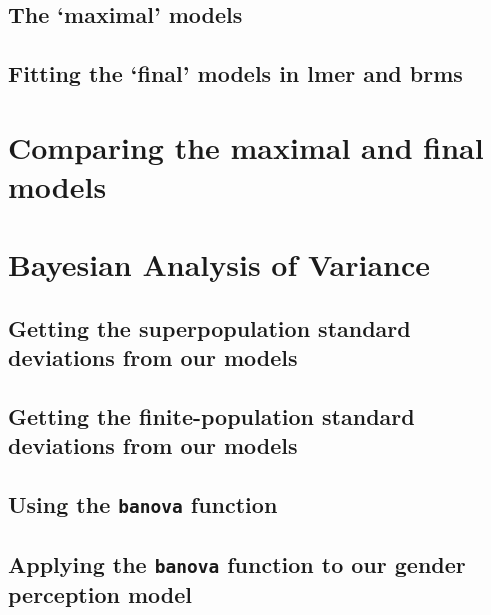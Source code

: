 \documentclass[
]{book}
\begin{document}
\hypertarget{the-maximal-models}{%
\subsection{The `maximal' models}\label{the-maximal-models}}

\hypertarget{fitting-the-final-models-in-lmer-and-brms}{%
\subsection{Fitting the `final' models in lmer and brms}\label{fitting-the-final-models-in-lmer-and-brms}}

\hypertarget{comparing-the-maximal-and-final-models}{%
\section{Comparing the maximal and final models}\label{comparing-the-maximal-and-final-models}}

\hypertarget{bayesian-analysis-of-variance}{%
\section{Bayesian Analysis of Variance}\label{bayesian-analysis-of-variance}}

\hypertarget{getting-the-superpopulation-standard-deviations-from-our-models}{%
\subsection{Getting the superpopulation standard deviations from our models}\label{getting-the-superpopulation-standard-deviations-from-our-models}}

\hypertarget{getting-the-finite-population-standard-deviations-from-our-models}{%
\subsection{Getting the finite-population standard deviations from our models}\label{getting-the-finite-population-standard-deviations-from-our-models}}

\hypertarget{using-the-banova-function}{%
\subsection{\texorpdfstring{Using the \texttt{banova} function}{Using the banova function}}\label{using-the-banova-function}}

\hypertarget{applying-the-banova-function-to-our-gender-perception-model}{%
\subsection{\texorpdfstring{Applying the \texttt{banova} function to our gender perception model}{Applying the banova function to our gender perception model}}\label{applying-the-banova-function-to-our-gender-perception-model}}
\end{document}
